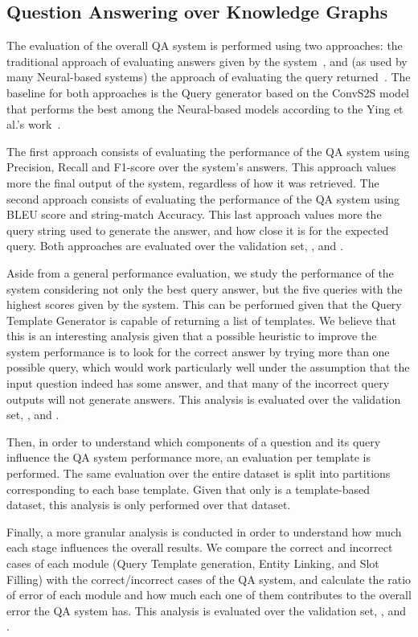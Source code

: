 \subsection{Question Answering over Knowledge Graphs}
\label{cap4:experimentalDesign/KGQA}
The evaluation of the overall QA system is performed using two approaches: the traditional 
approach of evaluating answers given by the system~\cite{qa:qald-Lopezetal2013}, and (as used by 
many Neural-based systems) the approach of evaluating the \SPARQL{} query 
returned~\cite{nmt:nl-to-sparql-Yin19}. The baseline for both approaches is the \SPARQL{} Query 
generator based on the ConvS2S model that performs the best among the Neural-based models 
according to the Ying et al.’s work~\cite{nmt:nl-to-sparql-Yin19}.

The first approach consists of evaluating the performance of the QA system using Precision, 
Recall and F1-score over the system’s answers. This approach values more the final output of the 
system, regardless of how it was retrieved. The second approach consists of evaluating the 
performance of the QA system using BLEU score and string-match Accuracy. This last approach 
values more the query string used to generate the answer, and how close it is for the expected 
query. Both approaches are evaluated over the \LCQuADtwo{} validation set, \QALDseven{}, and \WikiSPARQL{}.

Aside from a general performance evaluation, we study the performance of the system considering 
not only the best \SPARQL{} query answer, but the five \SPARQL{} queries with the highest scores given 
by the system. This can be performed given that the Query Template Generator is capable of 
returning a list of templates. We believe that this is an interesting analysis given that a 
possible heuristic to improve the system performance is to look for the correct answer by trying 
more than one possible \SPARQL{} query, which would work particularly well under the assumption 
that the input question indeed has some answer, and that many of the incorrect \SPARQL{} query 
outputs will not generate answers. This analysis is evaluated over the \LCQuADtwo{} validation set, 
\QALDseven{}, and \WikiSPARQL{}.

Then, in order to understand which components of a question and its \SPARQL{} query influence the 
QA system performance more, an evaluation per template is performed. The same evaluation over 
the entire dataset is split into partitions corresponding to each \LCQuADtwo{} base template. Given 
that only \LCQuADtwo{} is a template-based dataset, this analysis is only performed over that 
dataset.

Finally, a more granular analysis is conducted in order to understand how much each stage 
influences the overall results. We compare the correct and incorrect cases of each module (Query 
Template generation, Entity Linking, and Slot Filling) with the correct/incorrect cases of the 
QA system, and calculate the ratio of error of each module and how much each one of them 
contributes to the overall error the QA system has. This analysis is evaluated over the \LCQuADtwo{} 
validation set, \QALDseven{}, and \WikiSPARQL{}.
